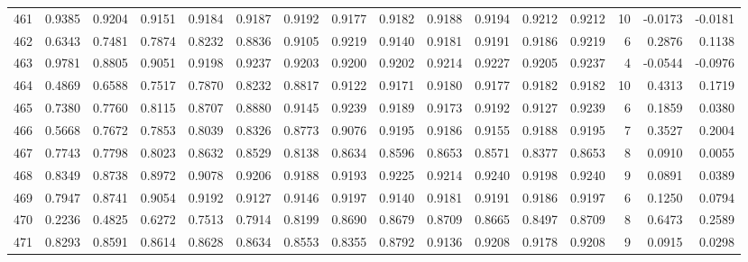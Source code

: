 \begin{tabular}{lrrrrrrrrrrrrrrr}
461 &      0.9385 &  0.9204 &  0.9151 &  0.9184 &  0.9187 &  0.9192 &  0.9177 &  0.9182 &  0.9188 &  0.9194 &   0.9212 &     0.9212 &     10 &                   -0.0173 &                    -0.0181 \\
462 &      0.6343 &  0.7481 &  0.7874 &  0.8232 &  0.8836 &  0.9105 &  0.9219 &  0.9140 &  0.9181 &  0.9191 &   0.9186 &     0.9219 &      6 &                    0.2876 &                     0.1138 \\
463 &      0.9781 &  0.8805 &  0.9051 &  0.9198 &  0.9237 &  0.9203 &  0.9200 &  0.9202 &  0.9214 &  0.9227 &   0.9205 &     0.9237 &      4 &                   -0.0544 &                    -0.0976 \\
464 &      0.4869 &  0.6588 &  0.7517 &  0.7870 &  0.8232 &  0.8817 &  0.9122 &  0.9171 &  0.9180 &  0.9177 &   0.9182 &     0.9182 &     10 &                    0.4313 &                     0.1719 \\
465 &      0.7380 &  0.7760 &  0.8115 &  0.8707 &  0.8880 &  0.9145 &  0.9239 &  0.9189 &  0.9173 &  0.9192 &   0.9127 &     0.9239 &      6 &                    0.1859 &                     0.0380 \\
466 &      0.5668 &  0.7672 &  0.7853 &  0.8039 &  0.8326 &  0.8773 &  0.9076 &  0.9195 &  0.9186 &  0.9155 &   0.9188 &     0.9195 &      7 &                    0.3527 &                     0.2004 \\
467 &      0.7743 &  0.7798 &  0.8023 &  0.8632 &  0.8529 &  0.8138 &  0.8634 &  0.8596 &  0.8653 &  0.8571 &   0.8377 &     0.8653 &      8 &                    0.0910 &                     0.0055 \\
468 &      0.8349 &  0.8738 &  0.8972 &  0.9078 &  0.9206 &  0.9188 &  0.9193 &  0.9225 &  0.9214 &  0.9240 &   0.9198 &     0.9240 &      9 &                    0.0891 &                     0.0389 \\
469 &      0.7947 &  0.8741 &  0.9054 &  0.9192 &  0.9127 &  0.9146 &  0.9197 &  0.9140 &  0.9181 &  0.9191 &   0.9186 &     0.9197 &      6 &                    0.1250 &                     0.0794 \\
470 &      0.2236 &  0.4825 &  0.6272 &  0.7513 &  0.7914 &  0.8199 &  0.8690 &  0.8679 &  0.8709 &  0.8665 &   0.8497 &     0.8709 &      8 &                    0.6473 &                     0.2589 \\
471 &      0.8293 &  0.8591 &  0.8614 &  0.8628 &  0.8634 &  0.8553 &  0.8355 &  0.8792 &  0.9136 &  0.9208 &   0.9178 &     0.9208 &      9 &                    0.0915 &                     0.0298 \\

\end{tabular}
